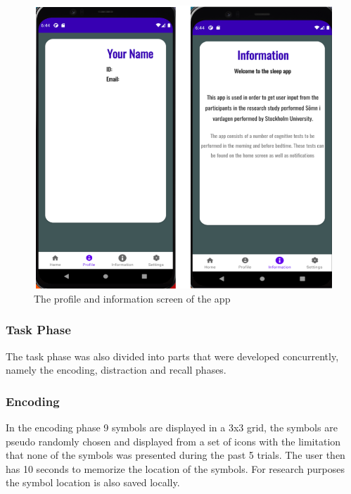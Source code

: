\documentclass{article}
\begin{document}
\begin{figure}[!h]
  \begin{center}
    \includegraphics[scale=0.8]{Android3.png}
    \caption{The profile and information screen of the app
}
    \label{fig:android3}
  \end{center}
\end{figure}

\subsubsection{Task Phase}
The task phase was also divided into parts that were developed concurrently, namely the encoding, distraction and recall phases.

\subsubsection{Encoding}
In the encoding phase 9 symbols are displayed in a 3x3 grid, the symbols are pseudo randomly chosen and displayed from a set of icons with the limitation that none of the symbols was presented during the past 5 trials. The user then has 10 seconds to memorize the location of the symbols. For research purposes the symbol location is also saved locally.
\end{document}

